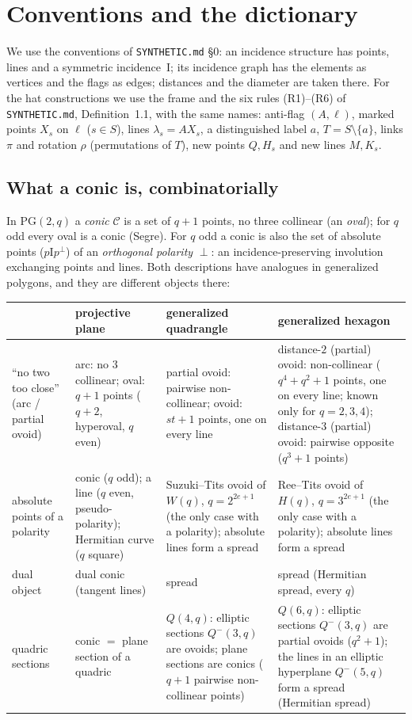 \documentclass[11pt]{amsart}
\theoremstyle{definition}
\theoremstyle{remark}
\newcommand{\I}{\mathrel{\mathrm{I}}}
\newcommand{\cC}{\mathcal{C}}
\newcommand{\lam}{\lambda}
\newcommand{\PG}{\mathrm{PG}}
\begin{document}
\setcounter{section}{-1}
\section{Conventions and the dictionary}

We use the conventions of \texttt{SYNTHETIC.md} \S0: an incidence structure has points, lines and a symmetric
incidence~$\I$; its incidence graph has the elements as vertices and the flags as edges; distances and the diameter
are taken there. For the hat constructions we use the frame and the six rules (R1)--(R6) of \texttt{SYNTHETIC.md},
Definition~1.1, with the same names: anti-flag $(A,\ell)$, marked points $X_s$ on $\ell$ ($s\in S$), lines
$\lam_s=AX_s$, a distinguished label $a$, $T=S\setminus\{a\}$, links $\pi$ and rotation $\rho$ (permutations of $T$),
new points $Q,H_s$ and new lines $M,K_s$.

\subsection{What a conic is, combinatorially}
In $\PG(2,q)$ a \emph{conic} $\cC$ is a set of $q+1$ points, no three collinear (an \emph{oval}); for $q$ odd every
oval is a conic (Segre). For $q$ odd a conic is also the set of absolute points ($p\I p^\perp$) of an
\emph{orthogonal polarity} $\perp$: an incidence-preserving involution exchanging points and lines. Both
descriptions have analogues in generalized polygons, and they are different objects there:

\begin{center}\small
\begin{tabular}{@{}p{2.6cm}p{3.4cm}p{4.3cm}p{5.2cm}@{}}
\toprule
& projective plane & generalized quadrangle & generalized hexagon \\
\midrule
``no two too close'' (arc / partial ovoid) & arc: no $3$ collinear; oval: $q+1$ points ($q+2$, hyperoval, $q$ even)
& partial ovoid: pairwise non-collinear; ovoid: $st+1$ points, one on every line
& distance-$2$ (partial) ovoid: non-collinear ($q^4+q^2+1$ points, one on every line; known only for $q=2,3,4$);
distance-$3$ (partial) ovoid: pairwise opposite ($q^3+1$ points) \\
absolute points of a polarity & conic ($q$ odd); a line ($q$ even, pseudo-polarity); Hermitian curve ($q$ square)
& Suzuki--Tits ovoid of $W(q)$, $q=2^{2e+1}$ (the only case with a polarity); absolute lines form a spread
& Ree--Tits ovoid of $H(q)$, $q=3^{2e+1}$ (the only case with a polarity); absolute lines form a spread \\
dual object & dual conic (tangent lines) & spread & spread (Hermitian spread, every $q$) \\
quadric sections & conic $=$ plane section of a quadric
& $Q(4,q)$: elliptic sections $Q^-(3,q)$ are ovoids; plane sections are conics ($q+1$ pairwise non-collinear points)
& $Q(6,q)$: elliptic sections $Q^-(3,q)$ are partial ovoids ($q^2+1$); the lines in an elliptic hyperplane
$Q^-(5,q)$ form a spread (Hermitian spread) \\
\bottomrule
\end{tabular}
\end{center}
\end{document}
